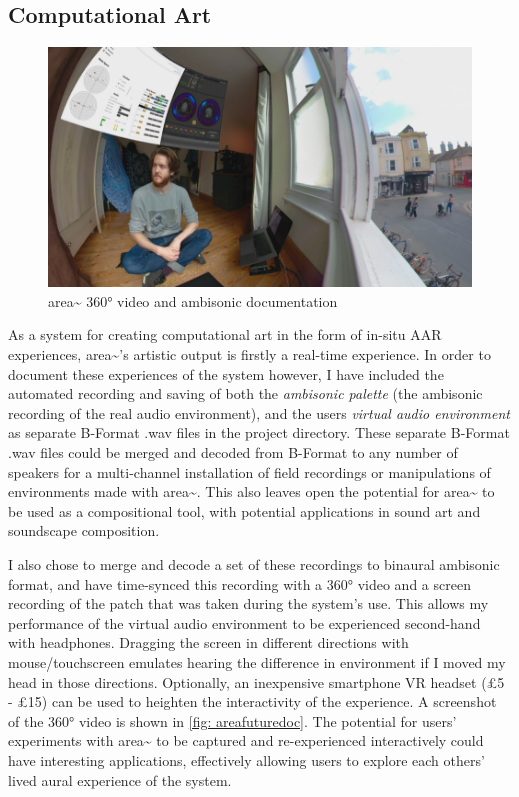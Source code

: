 \subsection{Computational Art}                  \label{sec: area-discussion-computationalart}
\begin{figure}
    \centering
    \includegraphics{figures/c_5/areafuturedoc.png}
    \caption{area\textasciitilde{} 360° video and ambisonic documentation \citep{bilbow2020}}
    \label{fig: areafuturedoc}
\end{figure}
As a system for creating computational art in the form of in-situ AAR experiences, area\textasciitilde{}’s artistic output is firstly a real-time experience. In order to document these experiences of the system however, I have included the automated recording and saving of both the \textit{ambisonic palette} (the ambisonic recording of the real audio environment), and the users \textit{virtual audio environment} as separate B-Format .wav files in the project directory. These separate B-Format .wav files could be merged and decoded from B-Format to any number of speakers for a multi-channel installation of field recordings or manipulations of environments made with area\textasciitilde{}. This also leaves open the potential for area\textasciitilde{} to be used as a compositional tool, with potential applications in sound art and soundscape composition.

I also chose to merge and decode a set of these recordings to binaural ambisonic format, and have time-synced this recording with a 360° video and a screen recording of the patch that was taken during the system’s use. This allows my performance of the virtual audio environment to be experienced second-hand with headphones. Dragging the screen in different directions with mouse/touchscreen emulates hearing the difference in environment if I moved my head in those directions. Optionally, an inexpensive smartphone VR headset (£5 - £15) can be used to heighten the interactivity of the experience. A screenshot of the 360° video \citep{bilbow2020} is shown in \autoref{fig: areafuturedoc}. The potential for users’ experiments with area\textasciitilde{} to be captured and re-experienced interactively could have interesting applications, effectively allowing users to explore each others’ lived aural experience of the system.

